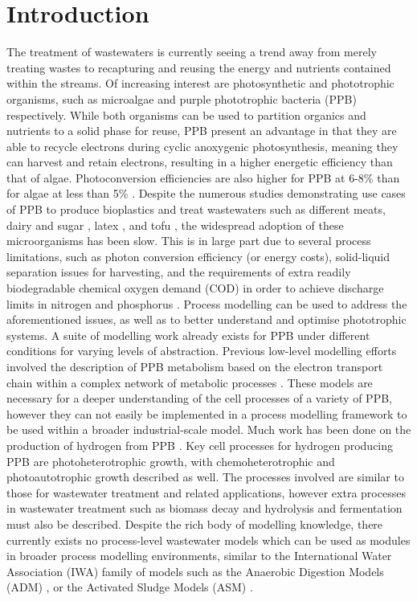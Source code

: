 \section{Introduction}
\label{Sec:chap2_intro}

The treatment of wastewaters is currently seeing a trend away from merely treating wastes to recapturing and reusing the energy and nutrients contained within the streams. Of increasing interest are photosynthetic and phototrophic organisms, such as microalgae \cite{Ward2014} and purple phototrophic bacteria (PPB) \cite{Hulsen2014} respectively. While both organisms can be used to partition organics and nutrients to a solid phase for reuse, PPB present an advantage in that they are able to recycle electrons during cyclic anoxygenic photosynthesis, meaning they can harvest and retain electrons, resulting in a higher energetic efficiency than that of algae. Photoconversion efficiencies are also higher for PPB at 6-8\% \cite{Miyake1987} than for algae at less than 5\% \cite{Posten2009}. Despite the numerous studies demonstrating use cases of PPB to produce bioplastics \cite{Melnicki2009} and treat wastewaters such as different meats, dairy and sugar \cite{Hulsen2018}, latex \cite{Kantachote2005}, and tofu \cite{Zhu1999}, the widespread adoption of these microorganisms has been slow. This is in large part due to several process limitations, such as photon conversion efficiency (or energy costs), solid-liquid separation issues for harvesting, and the requirements of extra readily biodegradable chemical oxygen demand (COD) in order to achieve discharge limits in nitrogen and phosphorus \cite{Hulsen2015}.
\skippingparagraph
Process modelling can be used to address the aforementioned issues, as well as to better understand and optimise phototrophic systems. A suite of modelling work already exists for PPB under different conditions for varying levels of abstraction. Previous low-level modelling efforts involved the description of PPB metabolism based on the electron transport chain within a complex network of metabolic processes \cite{Golomysova2010}. These models are necessary for a deeper understanding of the cell processes of a variety of PPB, however they can not easily be implemented in a process modelling framework to be used within a broader industrial-scale model. Much work has been done on the production of hydrogen from PPB \cite{Eroglu2008}. Key cell processes for hydrogen producing PPB are photoheterotrophic growth, with chemoheterotrophic and photoautotrophic growth described as well. The processes involved are similar to those for wastewater treatment and related applications, however extra processes in wastewater treatment such as biomass decay and hydrolysis and fermentation must also be described. Despite the rich body of modelling knowledge, there currently exists no process-level wastewater models which can be used as modules in broader process modelling environments, similar to the International Water Association (IWA) family of models \cite{Henze1987} such as the Anaerobic Digestion Models (ADM) \cite{Batstone2002}, or the Activated Sludge Models (ASM) \cite{Gujer1999}. 
